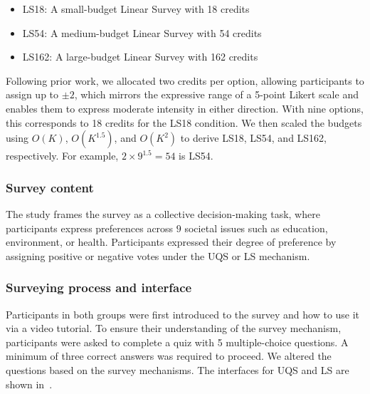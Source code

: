 \begin{itemize} 
    \item LS18: A small-budget Linear Survey with 18 credits
    \item LS54: A medium-budget Linear Survey with 54 credits
    \item LS162: A large-budget Linear Survey with 162 credits
\end{itemize}

Following prior work, we allocated two credits per option, allowing participants to assign up to $\pm2$, which mirrors the expressive range of a 5-point Likert scale and enables them to express moderate intensity in either direction. With nine options, this corresponds to 18 credits for the LS18 condition. We then scaled the budgets using $O(K)$, $O(K^{1.5})$, and $O(K^2)$ to derive LS18, LS54, and LS162, respectively. For example, $2 \times 9^{1.5} = 54$ is LS54.

\subsubsection{Survey content}
The study frames the survey as a collective decision-making task, where participants express preferences across $9$ societal issues such as education, environment, or health. Participants expressed their degree of preference by assigning positive or negative votes under the UQS or LS mechanism.

\subsubsection{Surveying process and interface}
Participants in both groups were first introduced to the survey and how to use it via a video tutorial. To ensure their understanding of the survey mechanism, participants were asked to complete a quiz with 5 multiple-choice questions. A minimum of three correct answers was required to proceed. We altered the questions based on the survey mechanisms. The interfaces for UQS and LS are shown in~.


